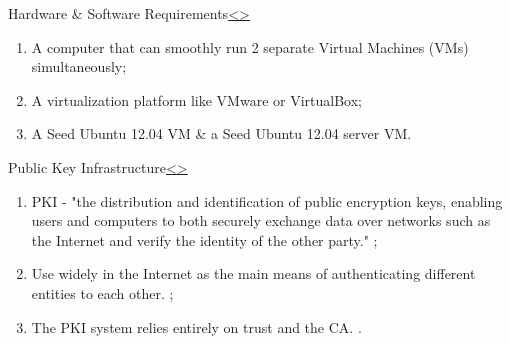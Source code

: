 \documentclass[12pt]{extarticle}
\newenvironment{instructionblock}{\Large\bgroup}{\egroup}
\newcommand{\ben}{\begin{enumerate}}
\newcommand{\een}{\end{enumerate}}
\begin{document}
	
	
	\pagebreak	
	\begin{slide}{Hardware \& Software Requirements}{\hyperref[slide 2]{\textless}\hyperref[slide 4]{\textgreater}}
		\begin{instructionblock}
			\ben
				\item A computer that can smoothly run 2 separate Virtual Machines (VMs) simultaneously;
				\item A virtualization platform like VMware or VirtualBox;
				\item A Seed Ubuntu 12.04 VM \& a Seed Ubuntu 12.04 server VM.
			\een
		\end{instructionblock}
	\end{slide}
	
	\pagebreak
	
	




\pagebreak	
\begin{slide}{Public Key Infrastructure}{\hyperref[slide 3]{\textless}\hyperref[slide 5]{\textgreater}}
	\begin{instructionblock}
		\begin{center}
		\end{center}
	\end{instructionblock}
\end{slide}

\vspace*{60mm}
\ben
	\item PKI - "the distribution and identification of public encryption keys, enabling users and computers to both securely exchange data over networks such as the Internet and verify the identity of the other party." \cite{TechTarget};
	\item Use widely in the Internet as the main means of authenticating different entities to each other. \cite{TechTarget};
	\item The PKI system relies entirely on trust and the CA. \cite{TechTarget}.
\een
\end{document}
